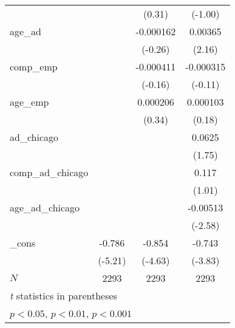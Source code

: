 {\begin{tabular}{l*{3}{c}}
            &                     &      (0.31)         &     (-1.00)         \\
[1em]
age\_ad      &                     &   -0.000162         &     0.00365\sym{*}  \\
            &                     &     (-0.26)         &      (2.16)         \\
[1em]
comp\_emp    &                     &   -0.000411         &   -0.000315         \\
            &                     &     (-0.16)         &     (-0.11)         \\
[1em]
age\_emp     &                     &    0.000206         &    0.000103         \\
            &                     &      (0.34)         &      (0.18)         \\
[1em]
ad\_chicago  &                     &                     &      0.0625         \\
            &                     &                     &      (1.75)         \\
[1em]
comp\_ad\_chicago&                     &                     &       0.117         \\
            &                     &                     &      (1.01)         \\
[1em]
age\_ad\_chicago&                     &                     &    -0.00513\sym{**} \\
            &                     &                     &     (-2.58)         \\
[1em]
\_cons      &      -0.786\sym{***}&      -0.854\sym{***}&      -0.743\sym{***}\\
            &     (-5.21)         &     (-4.63)         &     (-3.83)         \\
\hline
\(N\)       &        2293         &        2293         &        2293         \\
\hline\hline
\multicolumn{4}{l}{\footnotesize \textit{t} statistics in parentheses}\\
\multicolumn{4}{l}{\footnotesize \sym{*} \(p<0.05\), \sym{**} \(p<0.01\), \sym{***} \(p<0.001\)}\\
\end{tabular}
}
